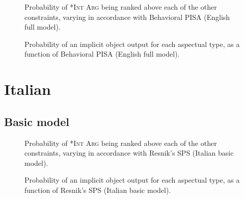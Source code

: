 \begin{figure}[!htb]
\caption{Probability of \textsc{*Int Arg} being ranked above each of the other constraints, varying in accordance with Behavioral PISA (English full model).}
    
\end{figure}

\begin{figure}[!htb]
\caption{Probability of an implicit object output for each aspectual type, as a function of Behavioral PISA (English full model).}
    
\end{figure}


\clearpage %

\section{Italian} 

\subsection{Basic model} 


\begin{figure}[!htb]
\caption{Probability of \textsc{*Int Arg} being ranked above each of the other constraints, varying in accordance with Resnik's SPS (Italian basic model).}
    
\end{figure}

\begin{figure}[!htb]
\caption{Probability of an implicit object output for each aspectual type, as a function of Resnik's SPS (Italian basic model).}
    
\end{figure}



